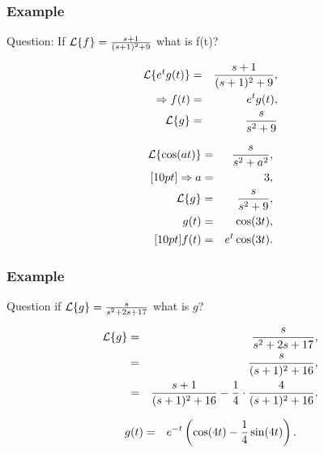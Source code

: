 \begin{frame}
  \frametitle{Example}

  \begin{block}{Question:}
    If $\laplace{f} = \frac{s+1}{(s+1)^2+9}$ what is f(t)?
  \end{block}

  {
    \begin{eqnarray*}
      \laplace{e^{t}g(t)} & = & \frac{s+1}{(s+1)^2+9}, \\
      \Rightarrow f(t) & = & e^{t} g(t), \\
      \laplace{g} & = & \frac{s}{s^2+9}
    \end{eqnarray*}
  }



\end{frame}


\begin{frame}

    \begin{eqnarray*}
      \laplace{\cos(at)} & = & \frac{s}{s^2+a^2}, \\ [10pt]
      \Rightarrow a & = & 3, \\
      \laplace{g} & = & \frac{s}{s^2+9}, \\
      g(t) & = & \cos(3t), \\ [10pt]
      f(t) & = & e^{t}\cos(3t).
    \end{eqnarray*}

\end{frame}


\begin{frame}
  \frametitle{Example}

  \begin{block}{Question}
    if $\laplace{g}=\frac{s}{s^2+2s+17}$ what is $g$?
  \end{block}

    {
      \begin{eqnarray*}
        \laplace{g} & = & \frac{s}{s^2+2s+17}, \\
        & = & \frac{s}{(s+1)^2+16}, \\
        & = & \frac{s+1}{(s+1)^2+16} - \frac{1}{4}\cdot\frac{4}{(s+1)^2+16}.
      \end{eqnarray*}
    }

    {
      \begin{eqnarray*}
        g(t) & = & e^{-t}\left( \cos(4t) - \frac{1}{4}\sin(4t)\right).
      \end{eqnarray*}
    }
  

\end{frame}


